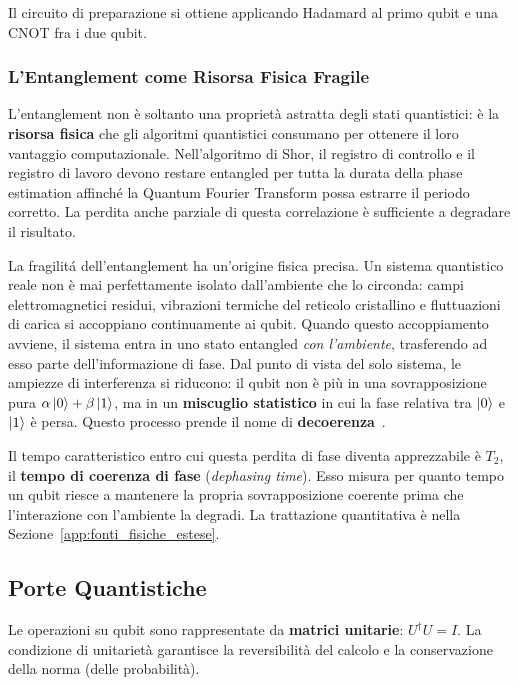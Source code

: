 \begin{onehalfspace}
Il circuito di preparazione si ottiene applicando Hadamard al primo qubit e
una CNOT fra i due qubit.

\subsubsection{L'Entanglement come Risorsa Fisica Fragile}
\label{sec:entanglement_fragile}

L'entanglement non è soltanto una proprietà astratta degli stati quantistici: è la \textbf{risorsa fisica} che gli algoritmi quantistici consumano per ottenere il loro vantaggio computazionale. Nell'algoritmo di Shor, il registro di controllo e il registro di lavoro devono restare entangled per tutta la durata della phase estimation affinché la Quantum Fourier Transform possa estrarre il periodo corretto. La perdita anche parziale di questa correlazione è sufficiente a degradare il risultato.

La fragilitá dell'entanglement ha un'origine fisica precisa. Un sistema quantistico reale non è mai perfettamente isolato dall'ambiente che lo circonda: campi elettromagnetici residui, vibrazioni termiche del reticolo cristallino e fluttuazioni di carica si accoppiano continuamente ai qubit. Quando questo accoppiamento avviene, il sistema entra in uno stato entangled \textit{con l'ambiente}, trasferendo ad esso parte dell'informazione di fase. Dal punto di vista del solo sistema, le ampiezze di interferenza si riducono: il qubit non è più in una sovrapposizione pura $\alpha\ket{0}+\beta\ket{1}$, ma in un \textbf{miscuglio statistico} in cui la fase relativa tra $\ket{0}$ e $\ket{1}$ è persa. Questo processo prende il nome di \textbf{decoerenza}~\cite{zurek2003}.

Il tempo caratteristico entro cui questa perdita di fase diventa apprezzabile è $T_2$, il \textbf{tempo di coerenza di fase} (\textit{dephasing time}). Esso misura per quanto tempo un qubit riesce a mantenere la propria sovrapposizione coerente prima che l'interazione con l'ambiente la degradi. La trattazione quantitativa è nella Sezione~\ref{app:fonti_fisiche_estese}.

\subsection{Porte Quantistiche}

Le operazioni su qubit sono rappresentate da \textbf{matrici unitarie}: $U^\dagger U = I$. La condizione di unitarietà garantisce la reversibilità del calcolo e la conservazione della norma (delle probabilità).


\end{onehalfspace}
